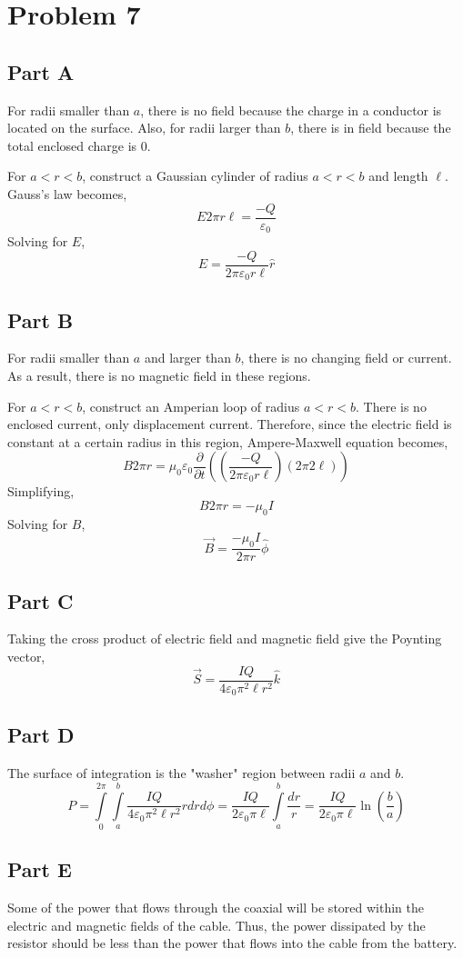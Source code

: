 \documentclass{article}
\begin{document}
\section*{Problem 7}

\subsection*{Part A}

For radii smaller than $a$, there is no field because the charge in a conductor
is located on the surface. Also, for radii larger than $b$, there is in field
because the total enclosed charge is $0$.

For $a < r < b$, construct a Gaussian cylinder of radius $a < r < b$ and length
$\ell$. Gauss's law becomes,
$$ E 2 \pi r \ell = \frac{-Q}{\varepsilon_0} $$
Solving for $E$,
$$ E = \frac{-Q}{2 \pi \varepsilon_0 r \ell} \hat{r} $$

\subsection*{Part B}

For radii smaller than $a$ and larger than $b$, there is no changing field or
current. As a result, there is no magnetic field in these regions.

For $a < r < b$, construct an Amperian loop of radius $a < r < b$. There is no
enclosed current, only displacement current. Therefore, since the electric field
is constant at a certain radius in this region, Ampere-Maxwell equation becomes,
$$ B 2 \pi r = \mu_0 \varepsilon_0 \frac{\partial}{\partial t} \left( \left(
\frac{-Q}{2 \pi \varepsilon_0 r \ell} \right) \left(2 \pi 2 \ell \right) \right)
$$
Simplifying,
$$ B 2 \pi r = - \mu_0 I $$
Solving for $B$,
$$ \vec{B} = \frac{- \mu_0 I}{2 \pi r} \hat{\phi} $$

\subsection*{Part C}

Taking the cross product of electric field and magnetic field give the Poynting
vector,
$$ \vec{S} = \frac{I Q}{4 \varepsilon_0 \pi^2 \ell r^2} \hat{k} $$

\subsection*{Part D}

The surface of integration is the "washer" region between radii $a$ and $b$.
$$ P = \int\limits_0^{2 \pi} \int\limits_a^b \frac{I Q}{4 \varepsilon_0 \pi^2
\ell r^2} r dr d\phi = \frac{I Q}{2 \varepsilon_0 \pi \ell} \int\limits_a^b
\frac{dr}{r} = \frac{I Q}{2 \varepsilon_0 \pi \ell} \ln\left(\frac{b}{a}\right) $$

\subsection*{Part E}

Some of the power that flows through the coaxial will be stored within the
electric and magnetic fields of the cable. Thus, the power dissipated by the
resistor should be less than the power that flows into the cable from the
battery.
\end{document}
